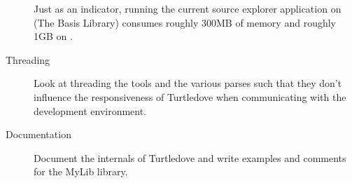 \begin{description}
  Just as an indicator, running the current source explorer application on
   (The Basis Library) consumes roughly 300MB of memory and
  roughly 1GB on .

\item[Threading] Look at threading the tools and the various parses such that
  they don't influence the responsiveness of Turtledove when communicating with
  the development environment.


\item[Documentation] Document the internals of Turtledove and write examples and
  comments for the MyLib library.

\end{description}

